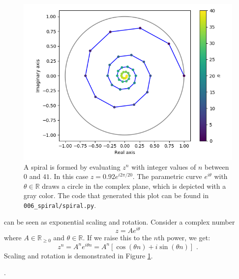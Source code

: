 \begin{figure}
\begin{center}
\includegraphics[width=\textwidth]{code/006_spiral/spiral.png}
\end{center}
\caption{A spiral is formed by evaluating $z^n$ with integer values of $n$ between $0$ and $41$. In this case $z = 0.92 e^{i 2\pi /20}$. The parametric curve $e^{i\theta}$ with $\theta \in \mathbb{R}$ draws a circle in the complex plane, which is depicted with a gray color. The code that generated this plot can be found in \texttt{006\_spiral/spiral.py}.}
\label{fig:spirals}
\end{figure}

 can be seen as exponential scaling and rotation. Consider a complex number
\begin{equation}
  z = A e^{i\theta}
\end{equation}
where $A \in \mathbb{R}_{\ge 0}$ and $\theta \in \mathbb{R}$. If we raise this to the $n$th power, we get:
\begin{equation}
  z^n = A^n e^{i\theta n} = A^n [\cos(\theta n) + i \sin(\theta n)]\,\,.
\end{equation}
Scaling and rotation is demonstrated in Figure \ref{fig:spirals}. 

. 






